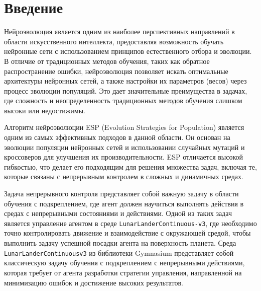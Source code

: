\documentclass[a4paper,12pt]{article}
\begin{document}
\tableofcontents
\setcounter{page}{2}
\newpage

\titleformat{\section}{\normalfont\bfseries}{\thesection}{1em}{}
\titleformat{\subsection}{\normalfont\bfseries}{\thesubsection}{1em}{}
\setlength{\parindent}{15mm}
\onehalfspacing

\section{Введение}
Нейроэволюция является одним из наиболее перспективных направлений в области искусственного интеллекта, предоставляя возможность обучать нейронные сети с использованием принципов естественного отбора и эволюции. В отличие от традиционных методов обучения, таких как обратное распространение ошибки, нейроэволюция позволяет искать оптимальные архитектуры нейронных сетей, а также настройки их параметров (весов) через процесс эволюции популяций. Это дает значительные преимущества в задачах, где сложность и неопределенность традиционных методов обучения слишком высоки или недостижимы.

Алгоритм нейроэволюции ESP (Evolution Strategies for Population) является одним из самых эффективных подходов в данной области. Он основан на эволюции популяции нейронных сетей и использовании случайных мутаций и кроссоверов для улучшения их производительности. ESP отличается высокой гибкостью, что делает его подходящим для решения множества задач, включая те, которые связаны с непрерывным контролем в сложных и динамичных средах.

Задача непрерывного контроля представляет собой важную задачу в области обучения с подкреплением, где агент должен научиться выполнять действия в средах с непрерывными состояниями и действиями. Одной из таких задач является управление агентом в среде \texttt{LunarLanderContinuous-v3}, где необходимо точно контролировать движение и взаимодействие с окружающей средой, чтобы выполнить задачу успешной посадки агента на поверхность планета. Среда \texttt{Lunar\-Lander\-Continuous\-v3} из библиотеки Gymnasium представляет собой классическую задачу обучения с подкреплением с непрерывными действиями, которая требует от агента разработки стратегии управления, направленной на минимизацию ошибок и достижение высоких результатов.
\end{document}
